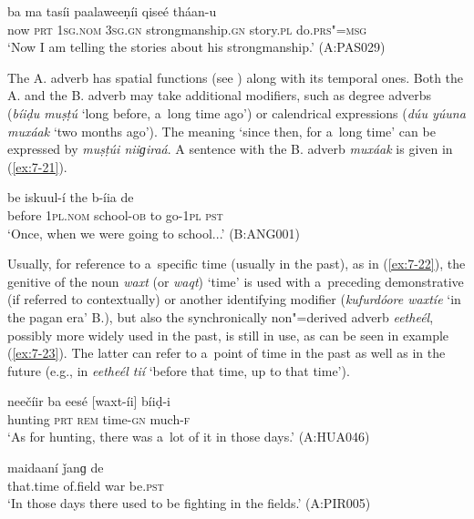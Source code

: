 \begin{exe}
\ex
\label{ex:7-20}
\gll [típa] ba ma tasíi paalaweeṇíi qiseé tháan-u \\
now \textsc{prt} \textsc{1sg.nom} \textsc{3sg.gn} strongmanship.\textsc{gn} story.\textsc{pl} do.\textsc{prs"=msg}\\
\glt `Now I am telling the stories about his strongmanship.' (A:PAS029)
\end{exe}

 The A. adverb has spatial functions (see ) along with its temporal ones. Both the A. and the B. adverb may take additional modifiers, such as degree adverbs (\textit{bíiḍu muṣṭú} `long before, a~long time ago') or calendrical expressions (\textit{dúu yúuna muxáak} `two months ago'). The meaning `since then, for a~long time' can be expressed by \textit{muṣṭúi niiɡiraá}. A sentence with the B. adverb \textit{muxáak} is given in (\ref{ex:7-21}).

\begin{exe}
\ex
\label{ex:7-21}
\gll [muxáak] be iskuul-í the b-íia de \\
before  \textsc{1pl.nom} school-\textsc{ob} to go-\textsc{1pl} \textsc{pst}\\
\glt `Once, when we were going to school...' (B:ANG001)
\end{exe}

 Usually, for reference to a~specific time (usually in the past), as in (\ref{ex:7-22}), the genitive of the noun \textit{waxt} (or \textit{waqt}) `time' is used with a~preceding demonstrative (if referred to contextually) or another identifying modifier (\textit{kufurdóore waxtíe} `in the pagan era' B.), but also the synchronically non"=derived adverb \textit{eetheél}, possibly more widely used in the past, is still in use, as can be seen in example (\ref{ex:7-23}). The latter can refer to a~point of time in the past as well as in the future (e.g., in \textit{eetheél tií} `before that time, up to that time').

\begin{exe}
\ex
\label{ex:7-22}
\gll neečíir ba eesé [waxt-íi] bíiḍ-i \\
hunting \textsc{prt} \textsc{rem} time-\textsc{gn}  much-\textsc{f} \\
\glt `As for hunting, there was a~lot of it in those days.' (A:HUA046)

\ex
\label{ex:7-23}
\gll [eetheél] maidaaní ǰanɡ de \\
that.time  of.field  war be.\textsc{pst } \\
\glt `In those days there used to be fighting in the fields.' (A:PIR005)
\end{exe}

